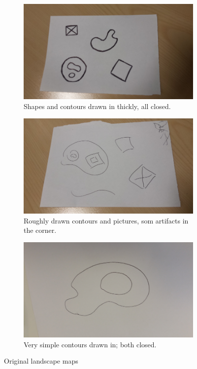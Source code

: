 \documentclass[11pt]{article}
\begin{document}
\begin{figure}[H]
	\begin{subfigure}[t]{.4\textwidth}
		\centering
		\includegraphics[scale=0.3]{pics/thicklines.jpg}
		\caption{Shapes and contours drawn in thickly, all closed.}
		\label{fig:landscapeMapThick}
	\end{subfigure}
	\hfill
	\begin{subfigure}[t]{.4\textwidth}
		\centering
		\includegraphics[scale=0.3]{pics/shitlines.jpg}
		\caption{Roughly drawn contours and pictures, som artifacts in the corner.}
		\label{fig:landscapeMapShit}
	\end{subfigure}
	
	
	\begin{subfigure}[t]{.4\textwidth}
		\centering
		\includegraphics[scale=0.3]{pics/simple.jpg}
		\caption{Very simple contours drawn in; both closed.}
		\label{fig:landscapeMapSimple}
	\end{subfigure}
	\caption{Original landscape maps}
	\label{fig:landscapeMaps}
\end{figure}
\end{document}
